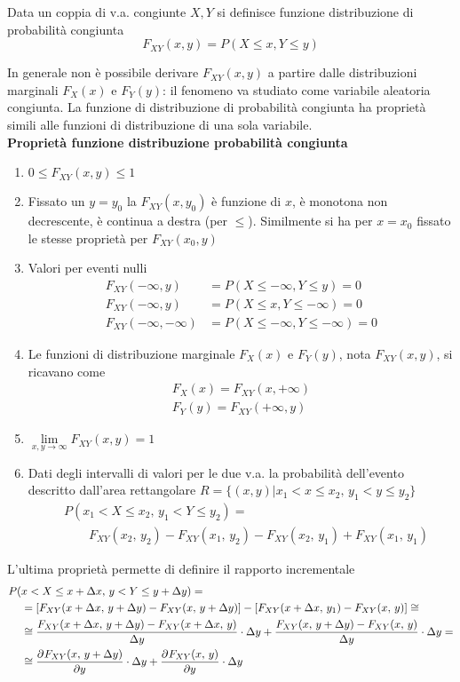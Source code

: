 Data un coppia di v.a. congiunte $X,Y$ si definisce funzione distribuzione di probabilità congiunta
\begin{equation}
F_{XY}(x,y)=P(X\leq x,Y\leq y)
\end{equation}\label{eq:funz_dist_prob_congiunta}

In generale non è possibile derivare $F_{XY}(x,y)$ a partire dalle distribuzioni marginali $F_X(x)$ e $F_Y(y)$: il fenomeno va studiato come variabile aleatoria congiunta.
La funzione di distribuzione di probabilità congiunta ha proprietà simili alle funzioni di distribuzione di una sola variabile.\\

\textbf{Proprietà funzione distribuzione probabilità congiunta}
\begin{enumerate}
\item $0\leq F_{XY}(x,y)\leq 1$
\item Fissato un $y=y_0$ la $F_{XY}(x,y_0)$ è funzione di $x$, è monotona non decrescente, è continua a destra (per $\leq$).
Similmente si ha per $x=x_0$ fissato le stesse proprietà per $F_{XY}(x_0,y)$
\item Valori per eventi nulli
\[\begin{split}
F_{XY}(-\infty,y)&=P(X\leq -\infty,Y\leq y)=0 \\
F_{XY}(-\infty,y)&=P(X\leq x,Y\leq -\infty)=0 \\
F_{XY}(-\infty,-\infty)&=P(X\leq -\infty,Y\leq -\infty)=0
\end{split}\]
\item Le funzioni di distribuzione marginale $F_X(x)$ e $F_Y(y)$, nota $F_{XY}(x,y)$, si ricavano come
\[\begin{split}
F_X(x)=F_{XY}(x,+\infty)\\F_Y(y)=F_{XY}(+\infty,y)
\end{split}\]
\item $\lim\limits_{x,y\to\infty}F_{XY}(x,y)=1$
\item Dati degli intervalli di valori per le due v.a. la probabilità dell'evento descritto dall'area rettangolare $R=\{(x,y)|x_1<x\leq x_2,\, y_1<y\leq y_2\}$
\[\begin{split}
&P(x_1<X\leq x_2,\,y_1<Y\leq y_2)=\\&\qquad F_{XY}(x_2,\,y_2)-F_{XY}(x_1,\,y_2)-F_{XY}(x_2,\,y_1)+F_{XY}(x_1,\,y_1)\end{split}\]
\end{enumerate}
L'ultima proprietà permette di definire il rapporto incrementale \[\begin{split}P(&x<X\leq x+\Delta x,\,y<Y\leq y+\Delta y)=\\
&=\left[F_{XY}(x+\Delta x,\,y+\Delta y)-F_{XY}(x,\,y+\Delta y)\right]-\left[F_{XY}(x+\Delta x,\,y_1)-F_{XY}(x,\,y)\right]\cong\\
&\cong\frac{F_{XY}(x+\Delta x,\,y+\Delta y)-F_{XY}(x+\Delta x,\,y)}{\Delta y}\cdot\Delta y+\frac{F_{XY}(x,\,y+\Delta y)-F_{XY}(x,\,y)}{\Delta y}\cdot\Delta y=\\
&\cong\frac{\partial^{}F_{XY}(x,\,y+\Delta y)}{\partial y^{}}\cdot\Delta y+\frac{\partial^{}F_{XY}(x,\,y)}{\partial y^{}}\cdot\Delta y
\end{split}\]
